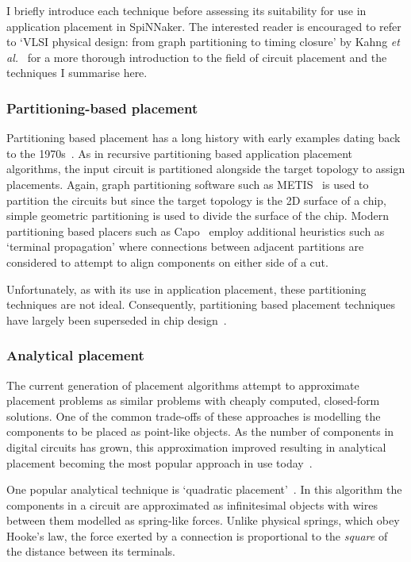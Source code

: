 			I briefly introduce each technique before assessing its suitability for
			use in application placement in SpiNNaker. The interested reader is
			encouraged to refer to `VLSI physical design: from graph partitioning to
			timing closure' by Kahng \emph{et al.}~\cite{kahng11} for a more thorough
			introduction to the field of circuit placement and the techniques I
			summarise here.
			
			\subsubsection{Partitioning-based placement}
				
				Partitioning based placement has a long history with early examples
				dating back to the 1970s~\cite{breuer77}. As in recursive partitioning
				based application placement algorithms, the input circuit is
				partitioned alongside the target topology to assign placements. Again,
				graph partitioning software such as METIS~\cite{karypis98} is used to
				partition the circuits but since the target topology is the 2D surface
				of a chip, simple geometric partitioning is used to divide the surface
				of the chip. Modern partitioning based placers such as
				Capo~\cite{roy05} employ additional heuristics such as `terminal
				propagation' where connections between adjacent partitions are
				considered to attempt to align components on either side of a cut.
				
				Unfortunately, as with its use in application placement, these
				partitioning techniques are not ideal.  Consequently, partitioning
				based placement techniques have largely been superseded in chip
				design~\cite{markov15}.
			
			\subsubsection{Analytical placement}
				
				The current generation of placement algorithms attempt to approximate
				placement problems as similar problems with cheaply computed,
				closed-form solutions. One of the common trade-offs of these approaches
				is modelling the components to be placed as point-like objects. As the
				number of components in digital circuits has grown, this approximation
				improved resulting in analytical placement becoming the most popular
				approach in use today~\cite{markov15}.
				
				One popular analytical technique is `quadratic
				placement'~\cite{kahng11,spindler08}. In this algorithm the components
				in a circuit are approximated as infinitesimal objects with wires
				between them modelled as spring-like forces. Unlike physical springs,
				which obey Hooke's law, the force exerted by a connection is
				proportional to the \emph{square} of the distance between its
				terminals.
				
